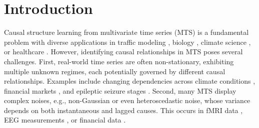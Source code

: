 \section{Introduction}\label{sec:introduction}
Causal structure learning from multivariate time series (MTS) is a fundamental problem with diverse applications in traffic modeling \citep{cheng2023causaltime}, biology \citep{sachs2005causal}, climate science \citep{runge2019detecting}, or healthcare \citep{shen2020challenges}. However, identifying causal relationships in MTS poses several challenges. First, real-world time series are often non-stationary, exhibiting multiple unknown regimes, each potentially governed by different causal relationships. Examples include changing dependencies across climate conditions \citep{karmouche2023regime}, financial markets \citep{huang2020causal}, and epileptic seizure stages \citep{wang2024ictal}. Second, many MTS display complex noises, e.g., non-Gaussian or even heteroscedastic noise, whose variance depends on both instantaneous and lagged causes. This occurs in fMRI data \citep{seiler2017multivariate}, EEG measurements \citep{huizenga1995equivalent}, or financial data \citep{hamilton1994autoregressive}.


